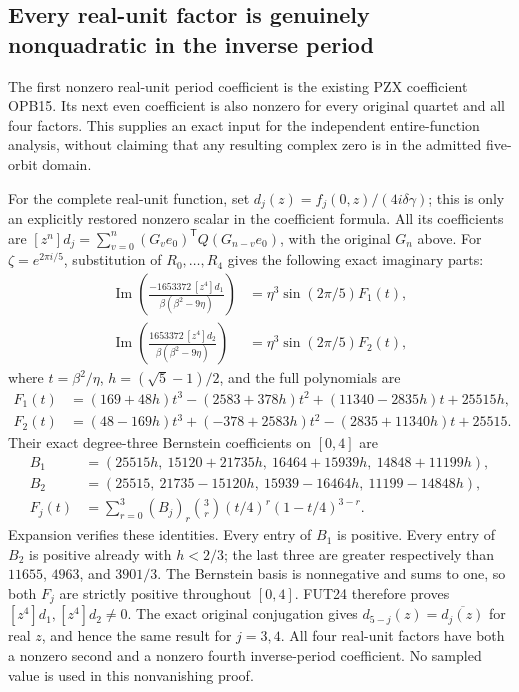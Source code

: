 \documentclass[11pt]{article}
\begin{document}
\subsection{Every real-unit factor is genuinely nonquadratic in the inverse period}
The first nonzero real-unit period coefficient is the existing PZX
coefficient OPB15. Its next even coefficient is also nonzero for every
original quartet and all four factors. This supplies an exact input
for the independent entire-function analysis, without claiming that
any resulting complex zero is in the admitted five-orbit domain.

For the complete real-unit function, set
$d_j(z)=f_j(0,z)/(4i\delta\gamma)$; this is only an explicitly
restored nonzero scalar in the coefficient formula. All its coefficients
are $[z^n]d_j=\sum_{v=0}^n(G_ve_0)^{\mathsf T}Q(G_{n-v}e_0)$,
with the original $G_n$ above. For $\zeta=e^{2\pi i/5}$, substitution
of $R_0,\ldots,R_4$ gives the following exact imaginary parts:
\[
 \begin{split}
 \operatorname{Im}\left(
   \frac{-1653372\,[z^4]d_1}{\beta(\beta^2-9\eta)}\right)
 &=\eta^3\sin(2\pi/5)F_1(t),\\
 \operatorname{Im}\left(
   \frac{1653372\,[z^4]d_2}{\beta(\beta^2-9\eta)}\right)
 &=\eta^3\sin(2\pi/5)F_2(t),
 \end{split}\tag{FUT24}
\]
where $t=\beta^2/\eta$, $h=(\sqrt5-1)/2$, and the full polynomials are
\[
 \begin{split}
 F_1(t)&=(169+48h)t^3-(2583+378h)t^2
                 +(11340-2835h)t+25515h,\\
 F_2(t)&=(48-169h)t^3+(-378+2583h)t^2
                 -(2835+11340h)t+25515.
 \end{split}\tag{FUT25}
\]
Their exact degree-three Bernstein coefficients on $[0,4]$ are
\[
 \begin{split}
 B_1&=(25515h,\ 15120+21735h,\ 16464+15939h,\ 14848+11199h),\\
 B_2&=(25515,\ 21735-15120h,\ 15939-16464h,\ 11199-14848h),\\
 F_j(t)&=\sum_{r=0}^3(B_j)_r\binom3r(t/4)^r(1-t/4)^{3-r}.
 \end{split}\tag{FUT26}
\]
Expansion verifies these identities. Every entry of $B_1$ is positive.
Every entry of $B_2$ is positive already with $h<2/3$; the last three
are greater respectively than $11655$, $4963$, and $3901/3$.
The Bernstein basis is nonnegative and sums to one, so both $F_j$
are strictly positive throughout $[0,4]$.
FUT24 therefore proves $[z^4]d_1,[z^4]d_2\ne0$.
The exact original conjugation gives $d_{5-j}(z)=\overline{d_j(z)}$
for real $z$, and hence the same result for $j=3,4$.
All four real-unit factors have both a nonzero second and a nonzero
fourth inverse-period coefficient. No sampled value is used in this
nonvanishing proof.
\end{document}
